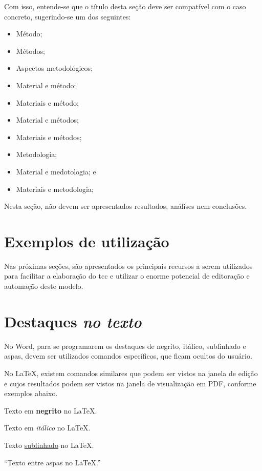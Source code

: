 Com isso, entende-se que o título desta seção deve ser compatível com o caso concreto, sugerindo-se um dos seguintes: 
\begin{itemize}
    \item Método;
    \item Métodos;
    \item Aspectos metodológicos;
    \item Material e método;
    \item Materiais e método;
    \item Material e métodos;
    \item Materiais e métodos;
    \item Metodologia;
    \item Material e medotologia; e
    \item Materiais e metodologia;
\end{itemize}

Nesta seção, não devem ser apresentados resultados, análises nem conclusões.

\section{Exemplos de utilização}

Nas próximas seções, são apresentados os principais recursos a serem utilizados para facilitar a elaboração do \ac{tcc} e utilizar o enorme potencial de editoração e automação deste modelo.

\section{Destaques \normalfont \bfseries \itshape no texto}\label{sec-destaques}

No Word, para se programarem os destaques de negrito, itálico, sublinhado e aspas, devem ser utilizados comandos específicos, que ficam ocultos do usuário.

No \LaTeX, existem comandos similares que podem ser vistos na janela de edição e cujos resultados podem ser vistos na janela de visualização em PDF, conforme exemplos abaixo.

Texto em \textbf{negrito} no \LaTeX.


Texto em \textit{itálico} no \LaTeX.

Texto \underline{sublinhado} no \LaTeX.

``Texto entre aspas no \LaTeX.''

